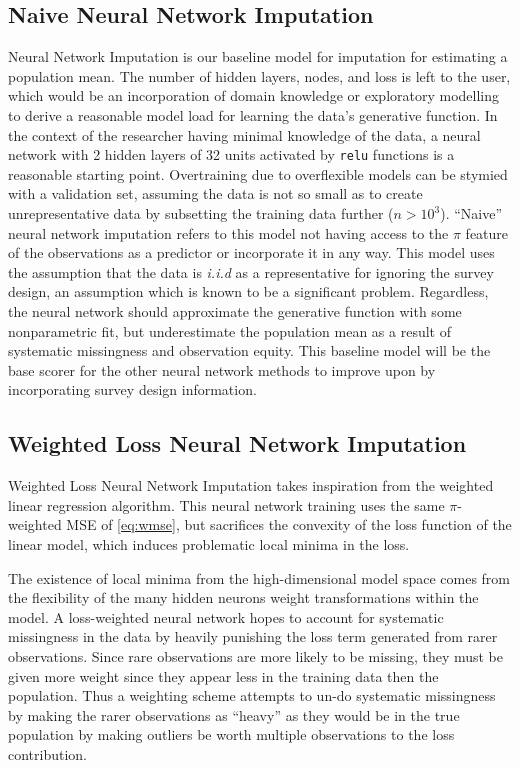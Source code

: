 \documentclass[12pt,twoside]{reedthesis}
\begin{document}
\subsection{Naive Neural Network
Imputation}\label{naive-neural-network-imputation}

Neural Network Imputation is our baseline model for imputation for
estimating a population mean. The number of hidden layers, nodes, and
loss is left to the user, which would be an incorporation of domain
knowledge or exploratory modelling to derive a reasonable model load for
learning the data's generative function. In the context of the
researcher having minimal knowledge of the data, a neural network with 2
hidden layers of 32 units activated by \texttt{relu} functions is a
reasonable starting point. Overtraining due to overflexible models can
be stymied with a validation set, assuming the data is not so small as
to create unrepresentative data by subsetting the training data further
(\(n > 10^3\)). ``Naive'' neural network imputation refers to this model
not having access to the \(\pi\) feature of the observations as a
predictor or incorporate it in any way. This model uses the assumption
that the data is \emph{i.i.d} as a representative for ignoring the
survey design, an assumption which is known to be a significant problem.
Regardless, the neural network should approximate the generative
function with some nonparametric fit, but underestimate the population
mean as a result of systematic missingness and observation equity. This
baseline model will be the base scorer for the other neural network
methods to improve upon by incorporating survey design information.

\subsection{Weighted Loss Neural Network
Imputation}\label{weighted-loss-neural-network-imputation}

Weighted Loss Neural Network Imputation takes inspiration from the
weighted linear regression algorithm. This neural network training uses
the same \(\pi\)-weighted MSE of \eqref{eq:wmse}, but sacrifices the
convexity of the loss function of the linear model, which induces
problematic local minima in the loss.

The existence of local minima from the high-dimensional model space
comes from the flexibility of the many hidden neurons weight
transformations within the model. A loss-weighted neural network hopes
to account for systematic missingness in the data by heavily punishing
the loss term generated from rarer observations. Since rare observations
are more likely to be missing, they must be given more weight since they
appear less in the training data then the population. Thus a weighting
scheme attempts to un-do systematic missingness by making the rarer
observations as ``heavy'' as they would be in the true population by
making outliers be worth multiple observations to the loss contribution.
\end{document}

